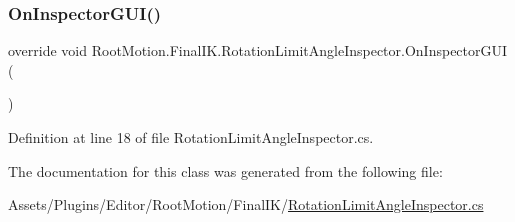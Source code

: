 \subsubsection{\texorpdfstring{On\+Inspector\+G\+U\+I()}{OnInspectorGUI()}}
{\footnotesize\ttfamily override void Root\+Motion.\+Final\+I\+K.\+Rotation\+Limit\+Angle\+Inspector.\+On\+Inspector\+G\+UI (\begin{DoxyParamCaption}{ }\end{DoxyParamCaption})}



Definition at line 18 of file Rotation\+Limit\+Angle\+Inspector.\+cs.



The documentation for this class was generated from the following file\+:\begin{DoxyCompactItemize}
\item 
Assets/\+Plugins/\+Editor/\+Root\+Motion/\+Final\+I\+K/\mbox{\hyperlink{_rotation_limit_angle_inspector_8cs}{Rotation\+Limit\+Angle\+Inspector.\+cs}}\end{DoxyCompactItemize}
